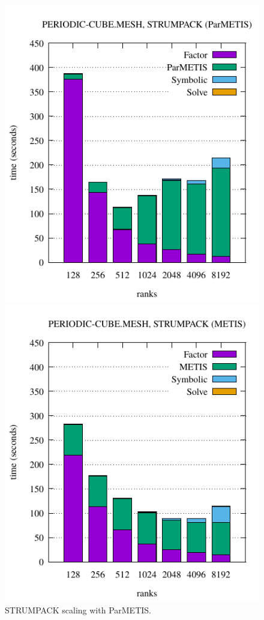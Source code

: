 {\vspace{-.3in}
\begin{figure}[htb]
\begin{minipage}[b]{0.48\columnwidth}
\centering
\includegraphics[scale=0.7]{projects/2.3.3-MathLibs/2.3.3.07-STRUMPACK-SuperLU/periodic-cube-scaling-strumpack.pdf}
\caption{STRUMPACK scaling with ParMETIS.}
\label{fig:strumpack-parmetis-scaling}
\end{minipage}
\begin{minipage}[b]{0.48\columnwidth}
\centering
\includegraphics[scale=0.7]{projects/2.3.3-MathLibs/2.3.3.07-STRUMPACK-SuperLU/periodic-cube-scaling-strumpack_metis.pdf}

\end{minipage}
\end{figure}}
